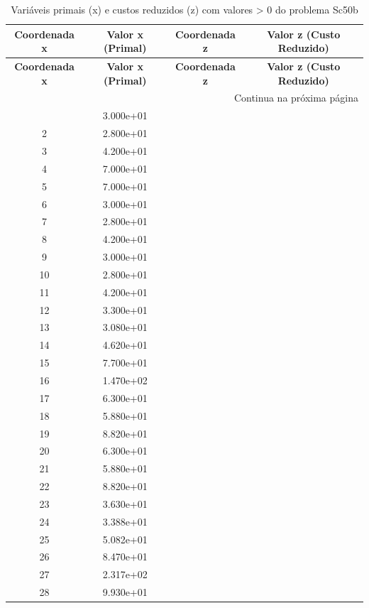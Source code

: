 \documentclass[12pt]{article}
\begin{document}
\begin{longtable}{@{}cccc@{}}
\caption{Variáveis primais (x) e custos reduzidos (z) com valores > 0 do problema Sc50b} \\
\toprule
\textbf{Coordenada x} & \textbf{Valor x (Primal)} & \textbf{Coordenada z} & \textbf{Valor z (Custo Reduzido)} \\
\midrule
\endfirsthead

\toprule
\textbf{Coordenada x} & \textbf{Valor x (Primal)} & \textbf{Coordenada z} & \textbf{Valor z (Custo Reduzido)} \\
\midrule
\endhead

\midrule \multicolumn{4}{r}{{Continua na próxima página}} \\ \midrule
\endfoot

\bottomrule
\endlastfoot
1 & 3.000e+01 &  &  \\
2 & 2.800e+01 &  &  \\
3 & 4.200e+01 &  &  \\
4 & 7.000e+01 &  &  \\
5 & 7.000e+01 &  &  \\
6 & 3.000e+01 &  &  \\
7 & 2.800e+01 &  &  \\
8 & 4.200e+01 &  &  \\
9 & 3.000e+01 &  &  \\
10 & 2.800e+01 &  &  \\
11 & 4.200e+01 &  &  \\
12 & 3.300e+01 &  &  \\
13 & 3.080e+01 &  &  \\
14 & 4.620e+01 &  &  \\
15 & 7.700e+01 &  &  \\
16 & 1.470e+02 &  &  \\
17 & 6.300e+01 &  &  \\
18 & 5.880e+01 &  &  \\
19 & 8.820e+01 &  &  \\
20 & 6.300e+01 &  &  \\
21 & 5.880e+01 &  &  \\
22 & 8.820e+01 &  &  \\
23 & 3.630e+01 &  &  \\
24 & 3.388e+01 &  &  \\
25 & 5.082e+01 &  &  \\
26 & 8.470e+01 &  &  \\
27 & 2.317e+02 &  &  \\
28 & 9.930e+01 &  &  \\

\end{longtable}
\end{document}

